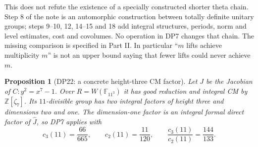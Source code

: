 \documentclass[11pt,a4paper]{article}
\newtheorem{proposition}[theorem]{Proposition}
\theoremstyle{definition}\newtheorem{remark}[theorem]{Remark}
\newcommand{\Z}{\mathbb Z}\newcommand{\Q}{\mathbb Q}\newcommand{\F}{\mathbb F}
\begin{document}
This does not refute the existence of a specially constructed shorter theta chain. Step 8 of the note is an automorphic construction between totally definite unitary groups; steps 9--10, 12, 14--15 and 18 add integral structures, periods, norm and level estimates, cost and covolumes. No operation in DP7 changes that chain. The missing comparison is specified in Part II. In particular ``$m$ lifts achieve multiplicity $m$'' is not an upper bound saying that fewer lifts could never achieve $m$.

\begin{proposition}[DP22: a concrete height-three CM factor]\label{DP22}
Let $J$ be the Jacobian of $C:y^2=x^7-1$. Over $R=W(\F_{11^3})$ it has good reduction and integral CM by $\Z[\zeta_7]$. Its $11$-divisible group has two integral factors of height three and dimensions two and one. The dimension-one factor is an integral formal direct factor of $\widehat J$, so DP7 applies with
\[
 c_3(11)=\frac{66}{665},\qquad c_2(11)=\frac{11}{120},
 \qquad\frac{c_3(11)}{c_2(11)}=\frac{144}{133}.
\]
\end{proposition}
\end{document}
